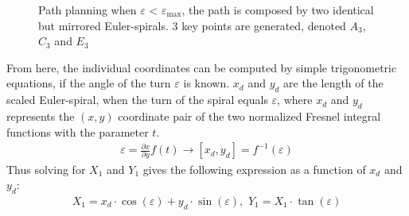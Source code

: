 \documentclass[a0,portrait]{a0poster}
\begin{document}
\begin{center}
{\begin{figure}
\begin{center}
		\caption{Path planning when $\varepsilon$ < $\varepsilon_\text{max}$, the path is composed by two identical but mirrored Euler-spirals. 3 key points are generated, denoted $A_3$, $C_3$ and $E_3$}
		\label{fig:3points}
	\end{center}
\end{figure}
From here, the individual coordinates can be computed by simple trigonometric equations, if the angle of the turn $\varepsilon$ is known. $x_d$ and $y_d$ are the length of the scaled Euler-spiral, when the turn of the spiral equals $\varepsilon$, where $x_d$ and $y_d$ represents the $(x,y)$ coordinate pair of the two normalized Fresnel integral functions with the parameter $t$.
\begin{align}
\varepsilon = \frac{\partial x}{\partial y}f(t) \to [x_d,y_d] = f^{-1}(\varepsilon)
\end{align}
Thus solving for $X_1$ and $Y_1$ gives the following expression as a function of $x_d$ and $y_d$:
\begin{align}
X_1 = x_d \cdot \cos(\varepsilon) + y_d \cdot \sin(\varepsilon),\,\, Y_1 = X_1 \cdot \tan(\varepsilon)
\end{align}

}
\col{
}
\end{center}
\end{document}
